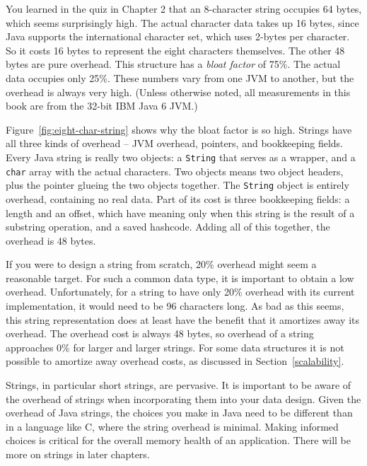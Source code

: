 \begin{example}
 You learned in the quiz in Chapter 2 that an 8-character string occupies 64 bytes, which seems surprisingly high. The actual character data takes up 16 bytes, since Java supports the international character set, which uses 2-bytes per character. So it costs 16 bytes to represent the eight characters themselves. The other 48 bytes are pure overhead. This structure has a \emph{bloat factor} of 75\%. The actual data occupies only 25\%. These numbers vary from one JVM to another, but the overhead is always very high. (Unless otherwise noted, all measurements in this book are from the 32-bit IBM Java 6 JVM.)

Figure~\ref{fig:eight-char-string} shows why the bloat factor is so high. Strings have all three kinds of overhead -- JVM overhead, pointers, and bookkeeping fields. Every Java string is really two objects: a {\tt String} that serves as a wrapper, and a {\tt char} array with the actual characters. Two objects means two object headers, plus the pointer glueing the two objects together. The {\tt String} object is entirely overhead, containing no real data. Part of its cost is three bookkeeping fields: a length and an offset, which have meaning only when this string is the result of a substring operation, and a saved hashcode. Adding all of this together, the overhead is 48 bytes.  
\end{example}
If you were to design a string from scratch, 20\%
overhead might seem a reasonable target. For such a common data type, it is important to obtain a low overhead.
Unfortunately, for a string to have only 20\% overhead with its current implementation, it would need
to be 96 characters long. As bad as this seems, this string
representation does at least have the benefit that it amortizes away
its overhead. The overhead cost is always 48 bytes, so overhead of a string approaches 0\% for larger and larger strings.  For some data structures it is not possible to
amortize away overhead costs, as discussed in
Section~\ref{scalability}.

Strings, in particular short strings, are pervasive. It is important to be aware of the overhead of strings when incorporating them into your data design. Given the overhead of Java strings, the choices you make in Java need to be different than in a language like C, where the string overhead is minimal. Making informed choices is critical for the overall memory health of an application. There will be more on strings in later chapters.

